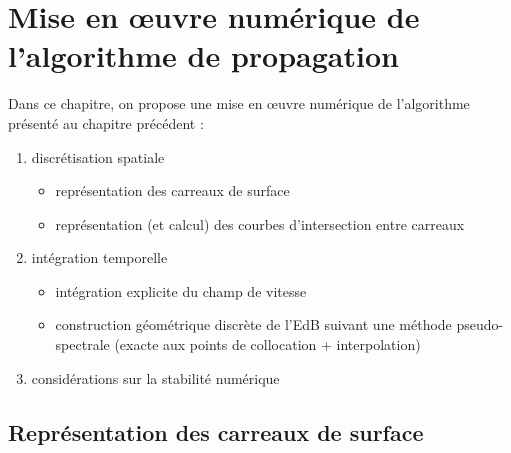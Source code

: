 \chapter{Mise en \oe uvre numérique de l'algorithme de propagation}
\label{chap:methode_numerique}

Dans ce chapitre, on propose une mise en \oe uvre numérique de l'algorithme présenté au chapitre précédent :
\begin{enumerate}
	\item discrétisation spatiale
	\begin{itemize}
		\item représentation des carreaux de surface
		\item représentation (et calcul) des courbes d'intersection entre carreaux
	\end{itemize}
	\item intégration temporelle
	\begin{itemize}
		\item intégration explicite du champ de vitesse 
		\item construction géométrique discrète de l'EdB suivant une méthode pseudo-spectrale (exacte aux points de collocation + interpolation)
	\end{itemize}
	\item considérations sur la stabilité numérique
\end{enumerate}



\section{Représentation des carreaux de surface}
